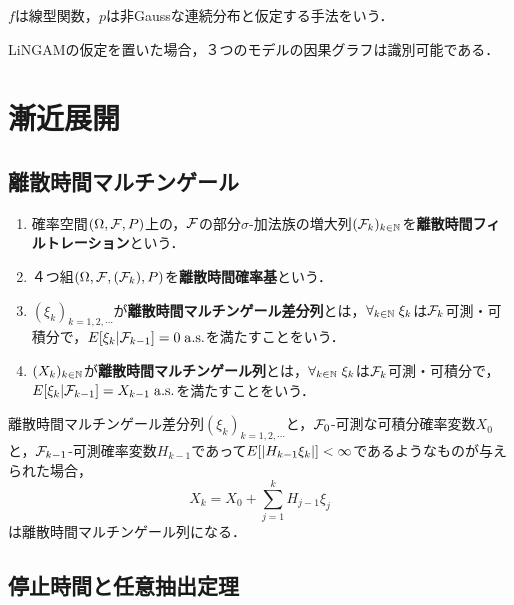 \documentclass[uplatex,dvipdfmx]{jsreport}
\begin{document}
\begin{definition}
    $f$は線型関数，$p$は非Gaussな連続分布と仮定する手法をいう．
\end{definition}

\begin{theorem}
    LiNGAMの仮定を置いた場合，３つのモデルの因果グラフは識別可能である．\cite{清水08}
\end{theorem}

\chapter{漸近展開}

\section{離散時間マルチンゲール}

\begin{definition}[filtration]\mbox{}
    \begin{enumerate}
        \item 確率空間$(\Omega,\mathcal{F},P)$上の，$\mathcal{F}$の部分$\sigma$-加法族の増大列$(\mathcal{F}_k)_{k\in\mathbb{N}}$を\textbf{離散時間フィルトレーション}という．
        \item ４つ組$(\Omega,\mathcal{F},(\mathcal{F}_k),P)$を\textbf{離散時間確率基}という．
        \item $(\xi_k)_{k=1,2,\cdots}$が\textbf{離散時間マルチンゲール差分列}とは，$\forall_{k\in\mathbb{N}}\;\xi_k$は$\mathcal{F}_k$可測・可積分で，$E[\xi_k|\mathcal{F}_{k-1}]=0\;\mathrm{a.s.}$を満たすことをいう．
        \item $(X_k)_{k\in\mathbb{N}}$が\textbf{離散時間マルチンゲール列}とは，$\forall_{k\in\mathbb{N}}\;\xi_k$は$\mathcal{F}_k$可測・可積分で，$E[\xi_k|\mathcal{F}_{k-1}]=X_{k-1}\;\mathrm{a.s.}$を満たすことをいう．
    \end{enumerate}
\end{definition}

\begin{lemma}
    離散時間マルチンゲール差分列$(\xi_k)_{k=1,2,\cdots}$と，$\mathcal{F}_0$-可測な可積分確率変数$X_0$と，$\mathcal{F}_{k-1}$-可測確率変数$H_{k-1}$であって$E[\lvert H_{k-1}\xi_k\rvert]<\infty$であるようなものが与えられた場合，
    \[X_k=X_0+\sum^k_{j=1}H_{j-1}\xi_j\]
    は離散時間マルチンゲール列になる．
\end{lemma}

\section{停止時間と任意抽出定理}
\end{document}
